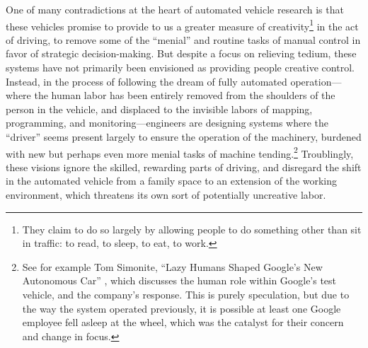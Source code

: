 One of many contradictions at the heart of
automated vehicle research is that these vehicles promise
to provide to us a greater measure of creativity\footnote{They claim
  to do so largely by allowing people to do something other than sit
  in traffic: to read, to sleep, to eat, to work.} in the act of
driving, to remove some of the ``menial'' and routine tasks of manual
control in favor of strategic decision-making. But
despite a focus on relieving tedium, these systems
have not primarily been envisioned as providing people creative
control. Instead, in the process of following 
the dream of fully automated operation---where the human labor has been
entirely removed from the shoulders of the person in the vehicle, and
displaced to the invisible labors of mapping, programming, and
monitoring---engineers are designing systems where the ``driver''
seems present largely to ensure the operation of the
machinery, burdened with new but perhaps even more menial tasks of
machine tending.\footnote{See for example Tom Simonite, ``Lazy Humans
Shaped Google's New Autonomous Car'' \cite{simonite}, which discusses
the human role within Google's test vehicle,
and the company's response. This is purely speculation, but due to
the way the system operated previously, it is possible at least one Google
employee fell asleep at the wheel, which was the catalyst for their
concern and change in focus.} Troublingly, these visions ignore the
skilled, rewarding parts of driving, and disregard the shift in the automated
  vehicle from a family space to an extension of the working environment,
  which threatens its own sort of potentially uncreative labor.

